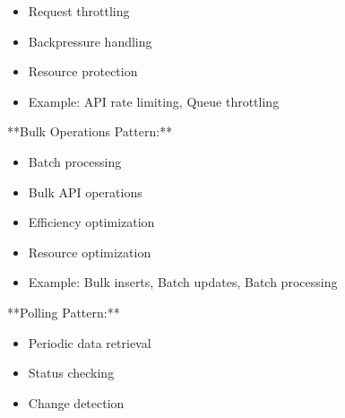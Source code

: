\documentclass[11pt,a4paper]{article}
\begin{document}
\begin{itemize}
\item Request throttling
\end{itemize}

\begin{itemize}
\item Backpressure handling
\end{itemize}

\begin{itemize}
\item Resource protection
\end{itemize}

\begin{itemize}
\item Example: API rate limiting, Queue throttling
\end{itemize}

**Bulk Operations Pattern:**

\begin{itemize}
\item Batch processing
\end{itemize}

\begin{itemize}
\item Bulk API operations
\end{itemize}

\begin{itemize}
\item Efficiency optimization
\end{itemize}

\begin{itemize}
\item Resource optimization
\end{itemize}

\begin{itemize}
\item Example: Bulk inserts, Batch updates, Batch processing
\end{itemize}

**Polling Pattern:**

\begin{itemize}
\item Periodic data retrieval
\end{itemize}

\begin{itemize}
\item Status checking
\end{itemize}

\begin{itemize}
\item Change detection
\end{itemize}
\end{document}
